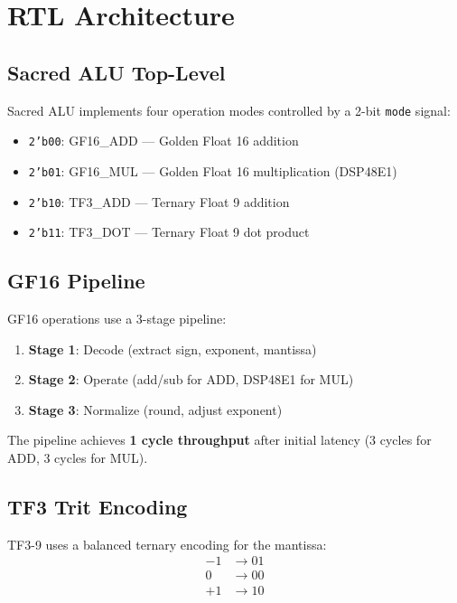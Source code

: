 \documentclass[10pt,conference]{IEEEtran}
\begin{document}

\section{RTL Architecture}

\subsection{Sacred ALU Top-Level}

Sacred ALU implements four operation modes controlled by a 2-bit \texttt{mode} signal:
\begin{itemize}
  \item \texttt{2'b00}: GF16\_ADD — Golden Float 16 addition
  \item \texttt{2'b01}: GF16\_MUL — Golden Float 16 multiplication (DSP48E1)
  \item \texttt{2'b10}: TF3\_ADD — Ternary Float 9 addition
  \item \texttt{2'b11}: TF3\_DOT — Ternary Float 9 dot product
\end{itemize}

\subsection{GF16 Pipeline}

GF16 operations use a 3-stage pipeline:
\begin{enumerate}
  \item \textbf{Stage 1}: Decode (extract sign, exponent, mantissa)
  \item \textbf{Stage 2}: Operate (add/sub for ADD, DSP48E1 for MUL)
  \item \textbf{Stage 3}: Normalize (round, adjust exponent)
\end{enumerate}

The pipeline achieves \textbf{1 cycle throughput} after initial latency (3 cycles for ADD, 3 cycles for MUL).

\subsection{TF3 Trit Encoding}

TF3-9 uses a balanced ternary encoding for the mantissa:
\begin{equation}
  \begin{aligned}
    -1 &\to 01 \\
    0  &\to 00 \\
    +1 &\to 10
  \end{aligned}
\end{equation}
\end{document}
